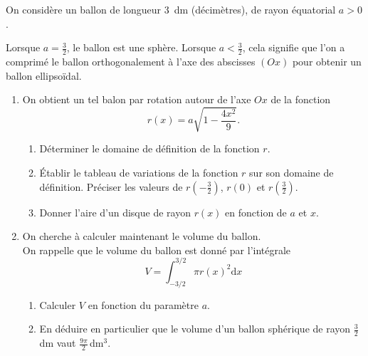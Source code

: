 \begin{exo}
    On considère un ballon de longueur {3}~{dm} (décimètres), de rayon équatorial $a>0$.

    Lorsque $a=\frac{3}{2}$, le ballon est une sphère.\newline
    Lorsque $a < \frac{3}{2}$, cela signifie que l'on a comprimé le ballon orthogonalement à l'axe des abscisses $(Ox)$ pour obtenir un ballon ellipsoïdal.

    \begin{enumerate}
        \item On obtient un tel balon par rotation autour de l'axe $Ox$ de la fonction
        $$
            r(x)=a\sqrt{1-\frac{4x^2}{9}}.
        $$
        \begin{enumerate}
            \item Déterminer le domaine de définition de la fonction $r$.
            \item Établir le tableau de variations de la fonction $r$ sur son domaine de définition. Préciser les valeurs de $r(-\frac{3}{2})$, $r(0)$ et $r(\frac{3}{2})$.
            \item Donner l'aire d'un disque de rayon $r(x)$ en fonction de $a$ et $x$.
        \end{enumerate}
        \item On cherche à calculer maintenant le volume du ballon.\\
        On rappelle que le volume du ballon est donné par l'intégrale
            $$
              V = \int_{-3/2}^{3/2} \pi r(x)^{2} \mathrm{d}x
            $$
        \begin{enumerate}
            \item Calculer $V$ en fonction du paramètre $a$.
            \item En déduire en particulier que le volume d'un ballon sphérique de rayon $\frac{3}{2}$\,{dm} vaut $\frac{9\pi}{2}$\,{dm$^3$}.
        \end{enumerate}
    \end{enumerate}
\end{exo}

